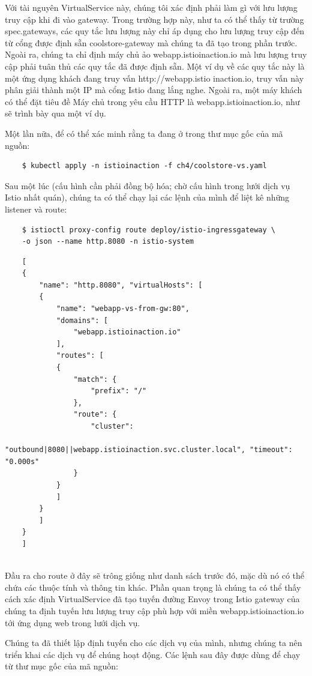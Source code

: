 \documentclass[12pt,a4paper]{report}
\begin{document}
Với tài nguyên VirtualService này, chúng tôi xác định phải làm gì với lưu lượng truy cập khi đi vào gateway. Trong trường hợp này, như ta có thể thấy từ trường spec.gateways, các quy tắc lưu lượng này chỉ áp dụng cho lưu lượng truy cập đến từ cổng được định sẵn coolstore-gateway mà chúng ta đã tạo trong phần trước. Ngoài ra, chúng ta chỉ định máy chủ ảo webapp.istioinaction.io mà lưu lượng truy cập phải tuân thủ các quy tắc đã được định sẵn. Một ví dụ về các quy tắc này là một ứng dụng khách đang truy vấn http://webapp.istio inaction.io, truy vấn này phân giải thành một IP mà cổng Istio đang lắng nghe. Ngoài ra, một máy khách có thể đặt tiêu đề Máy chủ trong yêu cầu HTTP là webapp.istioinaction.io, như sẽ trình bày qua một ví dụ.

Một lần nữa, để có thể xác minh rằng ta đang ở trong thư mục gốc của mã nguồn:
\begin{lstlisting}
	$ kubectl apply -n istioinaction -f ch4/coolstore-vs.yaml
\end{lstlisting}

Sau một lúc (cấu hình cần phải đồng bộ hóa; chờ cấu hình trong lưới dịch vụ Istio nhất quán), chúng ta có thể chạy lại các lệnh của mình để liệt kê những listener và route:

\begin{lstlisting}
	$ istioctl proxy-config route deploy/istio-ingressgateway \
	-o json --name http.8080 -n istio-system
\end{lstlisting}

\begin{lstlisting}
	[
	{
		"name": "http.8080", "virtualHosts": [
		{
			"name": "webapp-vs-from-gw:80",
			"domains": [
				"webapp.istioinaction.io"
			],
			"routes": [
			{
				"match": {
					"prefix": "/"
				},
				"route": {	  
					"cluster":				
					"outbound|8080||webapp.istioinaction.svc.cluster.local", "timeout": "0.000s"
				}
			}
			]
		}
		]
	}
	]
	
\end{lstlisting}

Đầu ra cho route ở đây sẽ trông giống như danh sách trước đó, mặc dù nó có thể chứa các thuộc tính và thông tin khác. Phần quan trọng là chúng ta có thể thấy cách xác định VirtualService đã tạo tuyến đường Envoy trong Istio gateway của chúng ta định tuyến lưu lượng truy cập phù hợp với miền webapp.istioinaction.io tới ứng dụng web trong lưới dịch vụ.

Chúng ta đã thiết lập định tuyến cho các dịch vụ của mình, nhưng chúng ta nên triển khai các dịch vụ để chúng hoạt động. Các lệnh sau đây được dùng để chạy từ thư mục gốc của mã nguồn:
\end{document}
